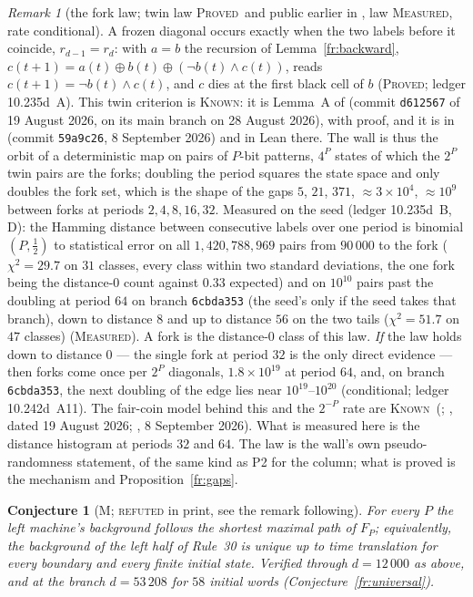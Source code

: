 \documentclass[11pt]{article}
\newtheorem{conjecture}[theorem]{Conjecture}
\theoremstyle{definition}
\theoremstyle{remark}
\newtheorem{remark}[theorem]{Remark}
\newcommand{\PROVED}{\textsc{Proved}}
\newcommand{\MEASURED}{\textsc{Measured}}
\newcommand{\KNOWN}{\textsc{Known}}
\begin{document}
\begin{remark}[the fork law; twin law \PROVED\ and public earlier in \cite{Pat,Dib}, law \MEASURED, rate conditional]\label{fr:forklaw}
A frozen diagonal occurs exactly when the two labels before it coincide, $r_{d-1}=r_d$: with $a=b$ the recursion of Lemma~\ref{fr:backward}, $c(t+1)=a(t)\oplus b(t)\oplus(\neg b(t)\wedge c(t))$, reads $c(t+1)=\neg b(t)\wedge c(t)$, and $c$ dies at the first black cell of $b$ (\PROVED; ledger 10.235d~A). This twin criterion is \KNOWN: it is Lemma~A of \cite{Pat} (commit \texttt{d612567} of 19 August 2026, on its main branch on 28 August 2026), with proof, and it is in \cite{Dib} (commit \texttt{59a9c26}, 8 September 2026) and in Lean there. The wall is thus the orbit of a deterministic map on pairs of $P$-bit patterns, $4^{P}$ states of which the $2^{P}$ twin pairs are the forks; doubling the period squares the state space and only doubles the fork set, which is the shape of the gaps $5$, $21$, $371$, $\approx3\times10^{4}$, $\approx10^{9}$ between forks at periods $2,4,8,16,32$. Measured on the seed (ledger 10.235d~B, D): the Hamming distance between consecutive labels over one period is binomial$(P,\tfrac12)$ to statistical error on all $1{,}420{,}788{,}969$ pairs from $90\,000$ to the fork ($\chi^{2}=29.7$ on $31$ classes, every class within two standard deviations, the one fork being the distance-$0$ count against $0.33$ expected) and on $10^{10}$ pairs past the doubling at period $64$ on branch \texttt{6cbda353} (the seed's only if the seed takes that branch), down to distance $8$ and up to distance $56$ on the two tails ($\chi^{2}=51.7$ on $47$ classes) (\MEASURED). A fork is the distance-$0$ class of this law. \emph{If} the law holds down to distance $0$ --- the single fork at period $32$ is the only direct evidence --- then forks come once per $2^{P}$ diagonals, $1.8\times10^{19}$ at period $64$, and, on branch \texttt{6cbda353}, the next doubling of the edge lies near $10^{19}$--$10^{20}$ (conditional; ledger 10.242d~A11). The fair-coin model behind this and the $2^{-P}$ rate are \KNOWN\ (\cite[\S8]{GG}; \cite{Pat}, dated 19 August 2026; \cite{Dib}, 8 September 2026). What is measured here is the distance histogram at periods $32$ and $64$. The law is the wall's own pseudo-randomness statement, of the same kind as P2 for the column; what is proved is the mechanism and Proposition~\ref{fr:gaps}.
\end{remark}

\begin{conjecture}[M; \textsc{refuted} in print, see the remark following]\label{fr:conjM}
For every $P$ the left machine's background follows the shortest maximal path of $F_P$; equivalently, the background of the left half of Rule~30 is unique up to time translation for every boundary and every finite initial state. Verified through $d=12\,000$ as above, and at the branch $d=53\,208$ for $58$ initial words (Conjecture~\ref{fr:universal}).
\end{conjecture}
\end{document}
